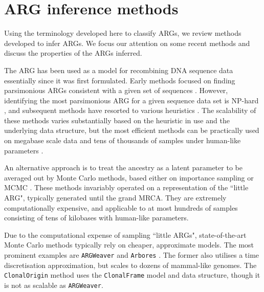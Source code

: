 \documentclass{article}
\begin{document}
\section*{ARG inference methods}
Using the terminology developed here to classify ARGs, we review methods developed
to infer ARGs. We focus our attention on some recent methods and discuss the
properties of the ARGs inferred.

The ARG has been used as a model for recombining DNA sequence data essentially
since it was first formulated. Early methods focused on finding parsimonious
ARGs consistent with a given set of
sequences \citep{hein1990reconstructing, lyngso2005minimum}.
However, identifying the most parsimonious ARG for a given sequence data set
is NP-hard \citep{wang2001perfect}, and subsequent methods have resorted to
various heuristics \citep{fallon2013acg, hein1993heuristic, ignatieva2021kwarg,
kelleher2019inferring, minichiello2006mapping, mirzaei2017rent,
parida2008estimating, song2005efficient, thao2019hybrid, zhang2021biobank}.
The scalability of these methods varies substantially based on the heuristic in use
and the underlying data structure, but the most efficient methods can be practically
used on megabase scale data and tens of thousands of samples under human-like
parameters \citep{kelleher2019inferring, zhang2021biobank}.

An alternative approach is to treat the ancestry as a latent parameter to be averaged out
by Monte Carlo methods, based either on importance sampling
\citep{griffiths1996ancestral, fearnhead2001estimating, jenkins2011inference}
or MCMC \citep{kuhner2000maximum, nielsen2000estimation, wang2008bayesian}.
These methods invariably operated on a representation of the ``little ARG", typically
generated until the grand MRCA. They are extremely computationally expensive,
and applicable to at most hundreds of samples consisting of tens of kilobases with
human-like parameters.

Due to the computational expense of sampling ``little ARGs", state-of-the-art
Monte Carlo methods typically rely on cheaper, approximate models.
The most prominent examples are \texttt{ARGWeaver} \citep{rasmussen2014genome}
and \texttt{Arbores} \citep{heine2018bridging}. The former also utilises a time
discretisation approximation, but scales to dozens of mammal-like genomes.
The \texttt{ClonalOrigin} method \citep{didelot2010inference,
medinaaguayo2020speeding} uses the \texttt{ClonalFrame}
model and data structure, though it is not as scalable as \texttt{ARGWeaver}.
\end{document}
